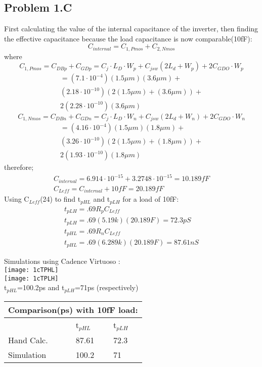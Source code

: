 \documentclass{article}
\begin{document}
   \subsection{Problem 1.C}
   First calculating the value of the internal capacitance of the inverter, then finding the effective capacitance because the load capacitance is now comparable(10fF):
   \begin{displaymath}
   C_{internal}=C_{1,Pmos} + C_{2,Nmos}
   \end{displaymath}    
   where
   \begin{displaymath}
   C_{1,Pmos}= C_{DBp}+C_{GDp}=C_{j} \cdot L_{D} \cdot W_{p} + C_{jsw}(2L_{d}+W_{p})+ 2C_{GDO} \cdot W_{p}
   \end{displaymath}
   \begin{gather}
   =(7.1 \cdot 10^{-4})( 1.5\mu m)(3.6\mu m)+ 
   \\(2.18\cdot 10^{-10})(2( 1.5\mu m)+(3.6\mu m))+
   \\ 2(2.28 \cdot 10^{-10})(3.6\mu m)
   \end{gather}
   \begin{displaymath}
   C_{1,Nmos}= C_{DBn}+C_{GDn}=C_{j} \cdot L_{D} \cdot W_{n} + C_{jsw}(2L_{d}+W_{n})+ 2C_{GDO} \cdot W_{n}
   \end{displaymath}
   \begin{gather}
   =(4.16 \cdot 10^{-4})( 1.5\mu m)(1.8\mu m)+ 
   \\(3.26\cdot 10^{-10})(2( 1.5\mu m)+(1.8\mu m))+
   \\ 2(1.93 \cdot 10^{-10})(1.8\mu m)
   \end{gather}
therefore;
	\begin{gather}
	C_{internal}=6.914 \cdot 10^{-15} + 3.2748 \cdot 10^{-15} = 10.189fF
	\\	C_{Leff}= C_{internal} + 10fF = 20.189fF
	\end{gather}
	Using C$_{Leff}$(24) to find  t$_{pHL}$ and t$_{pLH}$ for a load of 10fF:
	\begin{gather}
	t_{pLH}=.69R_{p}C_{Leff}
	\\
	t_{pLH}=.69(5.19k)(20.189F)= 72.3pS
	\\	
	t_{pHL}=.69R_{n}C_{Leff}
	\\
	t_{pHL}=.69(6.289k)(20.189F)= 87.61nS
	\end{gather}
	\newpage	
\begin{center}
	Simulations using Cadence Virtuoso :\\
	\texttt{[image: 1cTPHL]}\\
	\texttt{[image: 1cTPLH]}\\
	t$_{pHL}$=100.2ps and t$_{pLH}$=71ps (respectively)
\begin{tabular}{|p{3cm}||p{3cm}|p{3cm}|}
 \hline
 \multicolumn{3}{|c|}{Comparison(ps) with 10fF load:} \\
 \hline
  &t$_{pHL}$ & t$_{pLH}$\\
 \hline
 Hand Calc. & 87.61 &72.3 \\
 Simulation  & 100.2 &71 \\
 \hline
 \end{tabular}
\end{center}
\end{document}
